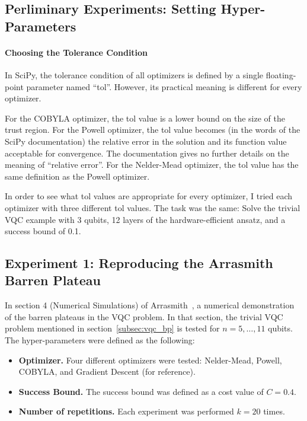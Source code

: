\documentclass[a4paper,12pt]{article}
\begin{document}
\subsection{Perliminary Experiments: Setting Hyper-Parameters} \label{subsec:exp_hyperparams}

\paragraph*{Choosing the Tolerance Condition}
In SciPy, the tolerance condition of all optimizers is defined by a single floating-point parameter named ``tol''. However, its practical meaning is different for every optimizer.

For the COBYLA optimizer, the tol value is a lower bound on the size of the trust region.
For the Powell optimizer, the tol value becomes (in the words of the SciPy documentation) the relative error in the solution and its function value acceptable for convergence. The documentation gives no further details on the meaning of ``relative error''.
For the Nelder-Mead optimizer, the tol value has the same definition as the Powell optimizer.

In order to see what tol values are appropriate for every optimizer, I tried each optimizer with three different tol values.
The task was the same: Solve the trivial VQC example with 3 qubits, 12 layers of the hardware-efficient ansatz, and a success bound of 0.1.

\smallskip


\subsection{Experiment 1: Reproducing the Arrasmith Barren Plateau} \label{subsec:recreate}
In section 4 (Numerical Simulations) of Arrasmith~\cite{arrasmith_effect_2021}, a numerical demonstration of the barren plateaus in the VQC problem.
In that section, the trivial VQC problem mentioned in section~\ref{subsec:vqc_bp} is tested for $n=5,\dots,11$ qubits.
The hyper-parameters were defined as the following:
\begin{itemize}
    \item \textbf{Optimizer.} Four different optimizers were tested: Nelder-Mead, Powell, COBYLA, and Gradient Descent (for reference).
    \item \textbf{Success Bound.} The success bound was defined as a cost value of $C=0.4$.
    \item \textbf{Number of repetitions.} Each experiment was performed $k=20$ times.
\end{itemize}
\end{document}
